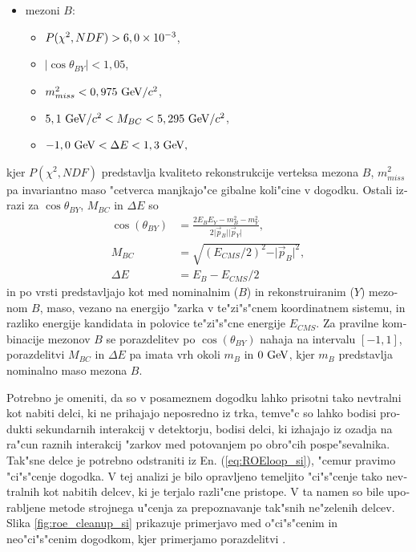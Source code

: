 \begin{otherlanguage}{slovene}
\begin{itemize}
\item mezoni $B$: 
\begin{itemize}
	\item $P(\chi^2, NDF) > 6,0\times 10^{-3}$, 
	\item $\vert \cos \theta_{BY} \vert < 1,05$,  
	\item $m_{miss}^2 < 0,975\mathrm{~GeV}/c^2$, 
	\item $5,1\mathrm{~GeV}/c^2 < M_{BC} < 5,295\mathrm{~GeV}/c^2$, 
	\item $-1,0\mathrm{~GeV} < \Delta E < 1,3\mathrm{~GeV},$
\end{itemize} 
\end{itemize}
kjer $P(\chi^2, NDF)$ predstavlja kvaliteto rekonstrukcije verteksa mezona $B$, $m_{miss}^2$ pa invariantno maso "cetverca manjkajo"ce gibalne koli"cine v dogodku. Ostali izrazi za $\cos \theta_{BY}$, $M_{BC}$ in $\Delta E$ so
\begin{align}
\cos \left(\theta_{BY}\right) &= \frac{2E_BE_Y - m_B^2 - m_Y^2}{2\vert \vec{p}_B \vert \vert \vec{p}_Y\vert},\\
M_{BC} &= \sqrt{\left(E_{CMS}/2\right)^2 - \vert \vec{p}_B \vert^2},\\
\Delta E &= E_B - E_{CMS}/2
\end{align}
in po vrsti predstavljajo kot med nominalnim ($B$) in rekonstruiranim ($Y$) mezonom $B$, maso, vezano na energijo "zarka v te"zi"s"cnem koordinatnem sistemu, in razliko energije kandidata in polovice te"zi"s"cne energije $E_{CMS}$. Za pravilne kombinacije mezonov $B$ se porazdelitev po $\cos \left(\theta_{BY}\right)$ nahaja na intervalu $[-1, 1]$, porazdelitvi $M_{BC}$ in $\Delta E$ pa imata vrh okoli $m_B$ in $0\mathrm{~GeV}$, kjer $m_B$ predstavlja nominalno maso mezona $B$.

Potrebno je omeniti, da so v posameznem dogodku lahko prisotni tako nevtralni kot nabiti delci, ki ne prihajajo neposredno iz trka, temve"c so lahko bodisi produkti sekundarnih interakcij v detektorju, bodisi delci, ki izhajajo iz ozadja na ra"cun raznih interakcij "zarkov med potovanjem po obro"cih pospe"sevalnika. Tak"sne delce je potrebno odstraniti iz En. (\ref{eq:ROEloop_si}), "cemur pravimo "ci"s"cenje dogodka. V tej analizi je bilo opravljeno temeljito "ci"s"cenje tako nevtralnih kot nabitih delcev, ki je terjalo razli"cne pristope. V ta namen so bile uporabljene metode strojnega u"cenja za prepoznavanje tak"snih ne"zelenih delcev. Slika \ref{fig:roe_cleanup_si} prikazuje primerjavo med o"ci"s"cenim in neo"ci"s"cenim dogodkom, kjer primerjamo porazdelitvi \varss.


\end{otherlanguage}
